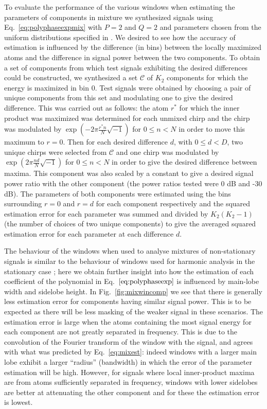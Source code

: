 \documentclass[twoside,a4paper]{article}
\begin{document}
To evaluate the performance of the various windows when estimating the
parameters of components in mixture we synthesized signals using
Eq.~\ref{eq:polyphaseexpmix} with $P=2$ and $Q=2$ and parameters chosen from the
uniform distributions specified in \cite{betser2009sinusoidal}.  We desired to
see how the accuracy of estimation is influenced by the difference (in bins)
between the locally maximized atoms and the difference in signal power between
the two components. To obtain a set of components from which test signals
exhibiting the desired differences could be constructed, we synthesized a set
$\mathcal{C}$ of $K_{2}$ components for which the energy is maximized in bin 0.
Test signals were obtained by choosing a pair of unique components from this set
and modulating one to give the desired difference.  This was carried out as
follows: the atom $r^{\ast}$ for which the inner product was maximized was
determined for each unmixed chirp and the chirp was modulated by $\exp(-2\pi
\frac{r^{\ast} n}{N}\sqrt{-1})$ for $0 \leq n < N$ in order to move this maximum
to $r=0$. Then for each desired difference $d$, with $0 \leq d < D$, two unique
chirps were selected from $\mathcal{C}$ and one chirp was modulated by
$\exp(2\pi \frac{n d}{N}\sqrt{-1})$ for $0 \leq n < N$ in order to give the
desired difference between maxima. This component was also scaled by a constant
to give a desired signal power ratio with the other component (the power ratios
tested were 0 dB and -30 dB). The parameters of
both components were estimated using the bins surrounding $r=0$ and $r=d$ for
each component respectively and the squared estimation error for each parameter
was summed and divided by $K_{2}(K_{2}-1)$ (the number of choices of two unique
components) to give the averaged squared estimation error for each parameter at
each difference $d$.

The behaviour of the windows when used to analyse mixtures of non-stationary
signals is similar to the behaviour of windows used for harmonic analysis in the
stationary case \cite{harris1978use}; here we obtain further insight into how
the estimation of each coefficient of the polynomial in
Eq.~$\ref{eq:polyphaseexp}$ is influenced by main-lobe width and sidelobe
height. In Fig.~\ref{fig:mixwincomp} we see that there is generally less
estimation error for components having similar signal power. This is to be
expected as there will be less masking of the weaker signal in these scenarios.
The estimation error is large when the atoms containing the most signal energy
for each component are not greatly separated in frequency.  This is due to the
convolution of the Fourier transform of the window with the signal, and agrees
with what was predicted by Eq.~\ref{eq:mixest}: indeed windows with a larger
main lobe exhibit a larger ``radius'' (bandwidth) in which the error of the
parameter estimation will be high.  However, for signals where local
inner-product maxima are from atoms sufficiently separated in frequency, windows
with lower sidelobes are better at attenuating the other component and for these
the estimation error is lowest.
\end{document}
